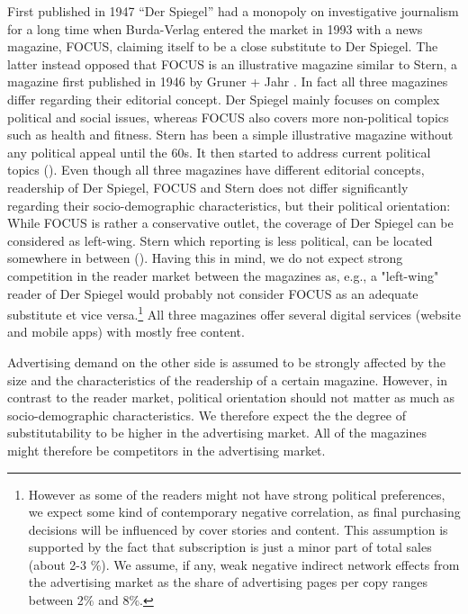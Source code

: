 \documentclass[12pt,a4paper,notitlepage]{article}
\begin{document}
First published in 1947 ``Der Spiegel'' had a monopoly on investigative journalism for a long time when Burda-Verlag entered the market in 1993 with a news magazine, FOCUS, claiming itself to be a close substitute to Der Spiegel. The latter instead opposed that FOCUS is an illustrative magazine similar to Stern, a magazine first published in 1946 by Gruner + Jahr \cite{kaltenhaeuser_abstimmung_2005}. In fact all three magazines differ regarding their editorial concept. Der Spiegel mainly focuses on complex political and social issues, whereas FOCUS also covers more non-political topics such as health and fitness. Stern has been a simple illustrative magazine without any political appeal until the 60s. It then started to address current political topics (\cite{vogel_populaere_1998}). Even though all three magazines have different editorial concepts, readership of Der Spiegel, FOCUS and Stern does not differ significantly regarding their socio-demographic characteristics, but their political orientation: While FOCUS is rather a conservative outlet, the coverage of Der Spiegel can be considered as left-wing. Stern which reporting is less political, can be located somewhere in between (\cite{kaltenhaeuser_abstimmung_2005}). Having this in mind, we do not expect strong competition in the reader market between the magazines as, e.g., a "left-wing" reader of Der Spiegel would probably not consider FOCUS as an adequate substitute et vice versa.\footnote{However as some of the readers might not have strong political preferences, we expect some kind of contemporary negative correlation, as final purchasing decisions will be influenced by cover stories and content. This assumption is supported by the fact that subscription is just a minor part of total sales (about 2-3 $\%$). We assume, if any, weak negative indirect network effects from the advertising market as the share of advertising pages per copy ranges between 2$\%$ and 8$\%$.} All three magazines offer several digital services (website and mobile apps) with mostly free content. 

Advertising demand on the other side is assumed to be strongly affected by the size and the characteristics of the readership of a certain magazine. However, in contrast to the reader market, political orientation should not matter as much as socio-demographic characteristics. We therefore expect the the degree of substitutability to be higher in the advertising market. All of the magazines might therefore be competitors in the advertising market.  
\end{document}
